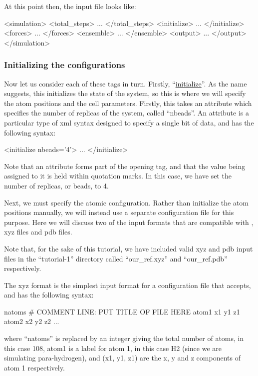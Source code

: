 \documentclass[11pt,english,fleqn]{report}
\newenvironment{code}{%
\footnotesize 
\verbatim
}{
\endverbatim
\normalsize
}
\begin{document}
At this point then, the input file looks like:

\begin{code}
<simulation>
   <total_steps>
      ...
   </total_steps>
   <initialize>
      ...
   </initialize>
   <forces>
      ...
   </forces>
   <ensemble>
      ...
   </ensemble>
   <output>
      ...
   </output>
</simulation>
\end{code}

\subsubsection{Initializing the configurations}

Now let us consider each of these tags in turn. Firstly, 
{}``\hyperref[INITIALIZER]{initialize}''.
As the name suggests, this initializes the state of the system, so
this is where we will specify the atom positions and the cell
parameters. Firstly, this takes an attribute which specifies the number
of replicas of the system, called {}``nbeads''. An attribute is
a particular type of xml syntax designed to specify a single bit of
data, and has the following syntax:

\begin{code}
<initialize nbeads='4'>
   ...
</initialize>
\end{code}

Note that an attribute forms part of the opening tag, and that the
value being assigned to it is held within quotation marks. In this
case, we have set the number of replicas, or beads, to 4.

Next, we must specify the atomic configuration. Rather than initialize
the atom positions manually, we will instead use a separate configuration 
file for this purpose.
Here we will discuss two of the input formats that are compatible
with \ipi, xyz files and pdb files.

Note that, for the sake of this tutorial, we have 
included valid xyz and pdb input
files in the {}``tutorial-1'' directory called {}``our\_ref.xyz''
and {}``our\_ref.pdb'' respectively.

The xyz format is the simplest input format
for a configuration file that \ipi accepts, and has the following
syntax:

\begin{code}
natoms
# COMMENT LINE: PUT TITLE OF FILE HERE
atom1   x1  y1  z1
atom2   x2  y2  z2
...
\end{code}
where {}``natoms'' is replaced by an integer giving the total number
of atoms, in this case 108, atom1 is a label for atom 1, in this case
H2 (since we are simulating para-hydrogen), and (x1, y1, z1) are the
x, y and z components of atom 1 respectively. 
\end{document}
